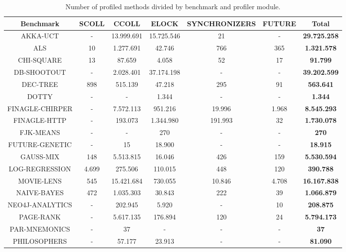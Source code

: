 \documentclass[]{usiinfthesis}
\begin{document}
\begin{table}
\centering
\caption{Number of profiled methods divided by benchmark and profiler module.}
{\scriptsize
\begin{tabular}{|c|c|c|c|c|c||c|}
\hline
\textbf{Benchmark}	&	\textbf{SCOLL}	&	\textbf{CCOLL}	&	\textbf{ELOCK}	&	\textbf{SYNCHRONIZERS}	&	\textbf{FUTURE}	& \textbf{Total} \\ 
\hline
AKKA-UCT	&	 -   	&	 13.999.691 	&	 15.725.546 	&	 21 	&	 -   	&	 \textbf{29.725.258} 	 \\ 
ALS	&	 10 	&	 1.277.691 	&	 42.746 	&	 766 	&	 365 	&	 \textbf{1.321.578} 	 \\ 
CHI-SQUARE	&	 13 	&	 87.659 	&	 4.058 	&	 52 	&	 17 	&	 \textbf{91.799} 	 \\ 
DB-SHOOTOUT	&	 -   	&	 2.028.401 	&	 37.174.198 	&	 -   	&	 -   	&	 \textbf{39.202.599} 	 \\ 
DEC-TREE	&	 898 	&	 515.139 	&	 47.218 	&	 295 	&	 91 	&	 \textbf{563.641} 	 \\ 
DOTTY	&	 -   	&	 - 	&	 1.344 	&	 -   	&	 -   	&	 \textbf{1.344} 	 \\ 
FINAGLE-CHIRPER	&	 -   	&	 7.572.113 	&	 951.216 	&	 19.996 	&	 1.968 	&	 \textbf{8.545.293} 	 \\ 
FINAGLE-HTTP	&	 -   	&	 193.073 	&	 1.344.980 	&	 191.993 	&	 32 	&	\textbf{ 1.730.078} 	 \\ 
FJK-MEANS	&	 -   	&	 - 	&	 270 	&	 -   	&	 -   	&	 \textbf{270} 	 \\ 
FUTURE-GENETIC	&	 -   	&	 15 	&	 18.900 	&	 -   	&	 -   	&	 \textbf{18.915} 	 \\ 
GAUSS-MIX	&	 148 	&	 5.513.815 	&	 16.046 	&	 426 	&	 159 	&	 \textbf{5.530.594} 	 \\ 
LOG-REGRESSION	&	 4.699 	&	 275.506 	&	 110.015 	&	 448 	&	 120 	&	 \textbf{390.788} 	 \\ 
MOVIE-LENS	&	 545 	&	 15.421.684 	&	 730.055 	&	 10.846 	&	 4.708 	&	\textbf{ 16.167.838} 	 \\ 
NAIVE-BAYES	&	 472 	&	 1.035.303 	&	 30.843 	&	 222 	&	 39 	&	\textbf{ 1.066.879} 	 \\ 
NEO4J-ANALYTICS	&	 -   	&	 202.945 	&	 5.920 	&	 -   	&	 10 	&	 \textbf{208.875} 	 \\ 
PAGE-RANK	&	 -   	&	 5.617.135 	&	 176.894 	&	 120 	&	 24 	&	\textbf{ 5.794.173 }	 \\ 
PAR-MNEMONICS	&	 -   	&	 37 	&	 -   	&	 -   	&	 -   	&	 \textbf{37} 	 \\ 
PHILOSOPHERS	&	 -   	&	 57.177 	&	 23.913 	&	 -   	&	 -   	&	 \textbf{81.090} 	 \\ 

\end{tabular}}
\end{table}
\end{document}
